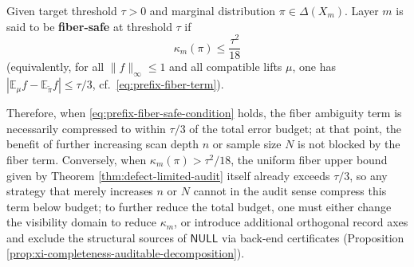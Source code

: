 \begin{corollary}\label{cor:prefix-audit-safe-resolution-stopping}
Given target threshold \(\tau>0\) and marginal distribution \(\pi\in\Delta(X_m)\).
Layer \(m\) is said to be \textbf{fiber-safe} at threshold \(\tau\) if
\begin{equation}\label{eq:prefix-fiber-safe-condition}
\boxed{\;\kappa_m(\pi)\le \frac{\tau^2}{18}\;}
\end{equation}
(equivalently, for all \(\|f\|_\infty\le 1\) and all compatible lifts \(\mu\), one has \(|\mathbb{E}_\mu f-\mathbb{E}_{\widetilde\pi}f|\le \tau/3\), cf.\ \eqref{eq:prefix-fiber-term}).
\par
Therefore, when \eqref{eq:prefix-fiber-safe-condition} holds, the fiber ambiguity term is necessarily compressed to within \(\tau/3\) of the total error budget; at that point, the benefit of further increasing scan depth \(n\) or sample size \(N\) is not blocked by the fiber term.
Conversely, when \(\kappa_m(\pi)>\tau^2/18\), the uniform fiber upper bound given by Theorem \ref{thm:defect-limited-audit} itself already exceeds \(\tau/3\), so any strategy that merely increases \(n\) or \(N\) cannot in the audit sense compress this term below budget; to further reduce the total budget, one must either change the visibility domain to reduce \(\kappa_m\), or introduce additional orthogonal record axes and exclude the structural sources of \(\mathsf{NULL}\) via back-end certificates (Proposition \ref{prop:xi-completeness-auditable-decomposition}).
\end{corollary}
